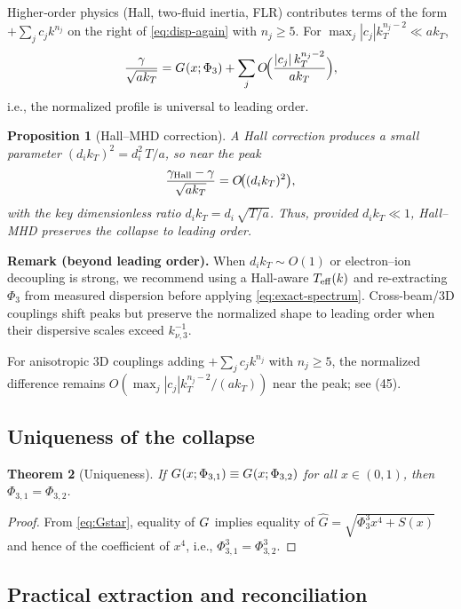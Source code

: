 \documentclass[aps,pre,twocolumn,showpacs,superscriptaddress]{revtex4-2}
\newtheorem{theorem}{Theorem}
\newtheorem{proposition}[theorem]{Proposition}
\theoremstyle{definition}
\begin{document}
Higher‑order physics (Hall, two‑fluid inertia, FLR) contributes terms of the form $+\sum_j c_j k^{n_j}$ on the right of \eqref{eq:disp-again} with $n_j\ge 5$. For $\max_j |c_j| k_T^{n_j-2}\ll a k_T$,
\begin{equation}\label{eq:equiv}
\frac{\gamma}{\sqrt{a k_T}} = G_{\*}(x;\Phi_3) + \sum_j O\!\Big(\frac{|c_j|\,k_T^{n_j-2}}{a k_T}\Big),
\end{equation}
i.e., the normalized profile is universal to leading order.

\begin{proposition}[Hall–MHD correction]\label{prop:hall}
A Hall correction produces a small parameter $(d_i k_T)^2=d_i^2\,T/a$, so near the peak
\[
\frac{\gamma_{\rm Hall}-\gamma}{\sqrt{a k_T}} = O\!\big((d_i k_T)^2\big),
\]
with the \emph{key dimensionless ratio} $d_i k_T=d_i\,\sqrt{T/a}$. Thus, provided $d_i k_T\ll 1$, Hall–MHD preserves the collapse to leading order.
\end{proposition}

\noindent\textbf{Remark (beyond leading order).}
When $d_i k_T\sim O(1)$ or electron--ion decoupling is strong, we recommend using a Hall-aware $T_{\rm eff}(k)$ and re-extracting $\Phi_3$ from measured dispersion before applying \eqref{eq:exact-spectrum}. Cross-beam/3D couplings shift peaks but preserve the normalized shape to leading order when their dispersive scales exceed $k_{\nu,3}^{-1}$.

For anisotropic 3D couplings adding $+\sum_j c_j k^{n_j}$ with $n_j \ge 5$, the normalized difference remains $O(\max_j |c_j| k_T^{n_j-2}/(a k_T))$ near the peak; see (45).

\subsection{Uniqueness of the collapse}\label{subsec:uniqueness}

\begin{theorem}[Uniqueness]\label{thm:unique}
If $G_{\*}(x;\Phi_{3,1})\equiv G_{\*}(x;\Phi_{3,2})$ for all $x\in(0,1)$, then $\Phi_{3,1}=\Phi_{3,2}$.
\end{theorem}

\begin{proof}
From \eqref{eq:Gstar}, equality of $G_{\*}$ implies equality of $\widehat{G}=\sqrt{\Phi_3^3 x^4+S(x)}$ and hence of the coefficient of $x^4$, i.e., $\Phi_{3,1}^3=\Phi_{3,2}^3$.
\end{proof}

\subsection{Practical extraction and reconciliation}\label{subsec:extraction}
\end{document}
